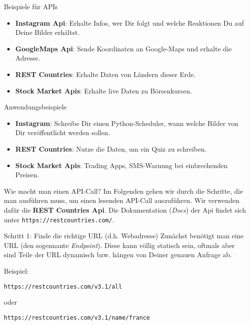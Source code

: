 \begin{frame}

\begin{exampleblock}{Beispiele für APIs}
\vspace{2pt}
\pause 
\begin{itemize}[<+->]
\item \textbf{Instagram Api}:  Erhalte Infos, wer Dir folgt und welche Reaktionen Du auf Deine Bilder erhältst.
\item \textbf{GoogleMaps Api}:  Sende Koordinaten an Google-Maps und erhalte die Adresse.
\item \textbf{REST Countries}: Erhalte Daten von Ländern dieser Erde.
\item \textbf{Stock Market Apis}: Erhalte live Daten zu Börsenkursen.
\end{itemize}
\end{exampleblock}

\vspace{12pt}
\pause 

\begin{exampleblock}{Anwendungsbeispiele}
\pause 
\begin{itemize}[<+->]
\item \textbf{Instagram}: Schreibe Dir einen Python-Scheduler, wann welche Bilder von Dir veröffentlicht werden sollen. 
\item \textbf{REST Countries}: Nutze die Daten, um ein Quiz zu schreiben.
\item \textbf{Stock Market Apis}: Trading Apps, SMS-Warnung bei einbrechenden Preisen. 
\end{itemize}
\end{exampleblock}
\end{frame}

\begin{frame}
\begin{block}{Wie macht man einen API-Call?}
\vspace{2pt}
Im Folgenden gehen wir durch die Schritte, die man ausführen muss, um einen lesenden API-Call auszuführen. Wir verwenden dafür die \textbf{REST Countries Api}. Die Dokumentation (\emph{Docs}) der Api findet sich unter \texttt{https://restcountries.com/}.
\end{block}

\end{frame}

\begin{frame}
\begin{block}{Schritt 1: Finde die richtige URL (d.h. Webadresse)}
\vspace{2pt}
Zunächst benötigt man eine URL (den sogennante \emph{Endpoint}). Diese kann völlig statisch sein, oftmals aber sind Teile der URL dynamisch bzw. hängen von Deiner genauen Anfrage ab. 

Beispiel:

\texttt{https://restcountries.com/v3.1/all} 

oder 

\texttt{https://restcountries.com/v3.1/name/france}
\end{block}
\end{frame}


